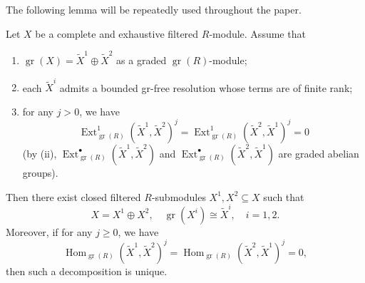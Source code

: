 \documentclass[11pt,a4paper]{article} %
\def\Ext{\operatorname{Ext}} %
\def\gr{\operatorname{gr}}
\def\Hom{\operatorname{Hom}}
\begin{document}
The following lemma will be repeatedly used throughout the paper.

\begin{lemma}\label{lem:decomposition-criterion}
    Let $X$ be a complete and exhaustive filtered $R$-module. Assume that 
    \begin{enumerate}
        \item $\gr(X)=\widetilde{X}^1\oplus\widetilde{X}^2$ as a graded $\gr(R)$-module;
        \item each $\widetilde{X}^i$ admits a bounded gr-free resolution whose terms are of finite rank;
        \item for any $j>0$, we have
    \begin{equation}\label{eq:graded-Ext-vanish}
        \Ext^1_{\gr(R)}(\widetilde{X}^1,\widetilde{X}^2)^j=\Ext^1_{\gr(R)}(\widetilde{X}^2,\widetilde{X}^1)^j=0
    \end{equation}
    (by \textup{(ii)}, $\Ext^\bullet_{\gr(R)}(\widetilde{X}^1,\widetilde{X}^2)$ and $\Ext^\bullet_{\gr(R)}(\widetilde{X}^2,\widetilde{X}^1)$ are graded abelian groups).
    \end{enumerate}
    Then there exist closed filtered $R$-submodules $X^1,X^2\subseteq X$
    such that 
    \[
    X=X^1\oplus X^2,\quad\gr(X^i)\cong \widetilde{X}^i,\quad i=1,2.
    \]
    Moreover, if for any $j\ge0$, we have
    \begin{equation}\label{eq:graded-Hom-vanish}
        \Hom_{\gr(R)}(\widetilde{X}^1,\widetilde{X}^2)^j=\Hom_{\gr(R)}(\widetilde{X}^2,\widetilde{X}^1)^j=0,
    \end{equation}
    then such a decomposition is unique.
\end{lemma}
\end{document}
